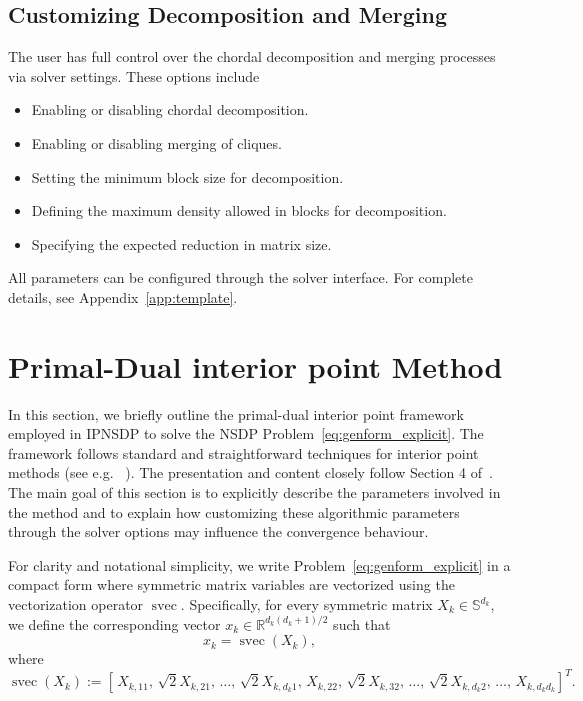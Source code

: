 \documentclass[]{interact}
\theoremstyle{plain}%
\theoremstyle{definition}
\theoremstyle{remark}
\begin{document}
\subsection{Customizing Decomposition and Merging}
\label{sec:chord_options}

The user has full control over the chordal decomposition and merging processes via solver settings. These options include

\begin{itemize}
  \item Enabling or disabling chordal decomposition.
  \item Enabling or disabling merging of cliques.
  \item Setting the minimum block size for decomposition.
  \item Defining the maximum density allowed in blocks for decomposition.
  \item Specifying the expected reduction in matrix size.
\end{itemize}

All parameters can be configured through the solver interface. For complete details, see Appendix~\ref{app:template}.





\section{Primal-Dual interior point Method}\label{sec:IPM}
In this section, we briefly outline the primal-dual interior point framework employed in IPNSDP to solve the NSDP  Problem~\eqref{eq:genform_explicit}. The framework follows standard and straightforward techniques for interior point methods (see e.g. ~\cite{Wright1997, IPMSDP_2012, Weldeyesus2015}). The presentation and content closely follow Section 4 of~\cite{Weldeyesus2022}. The main goal of this section is to explicitly describe the parameters involved in the method and to explain how customizing these algorithmic parameters through the solver options may influence the convergence behaviour.

For clarity and notational simplicity, we write Problem~\eqref{eq:genform_explicit} in a compact form where symmetric matrix variables are vectorized using the vectorization operator \( \operatorname{svec} \). Specifically, for every symmetric matrix \( X_k \in \mathbb{S}^{d_k} \), we define the corresponding vector \(x_k  \in \mathbb{R}^{d_k(d_k+1)/2}\) such that
\[x_k = \operatorname{svec}(X_k),\]
 where 
\[
\operatorname{svec}(X_k) := [\, X_{k,11},\, \sqrt{2}X_{k,21},\, \dots,\, \sqrt{2}X_{k,d_k1},\, X_{k,22},\, \sqrt{2}X_{k,32},\, \dots,\, \sqrt{2}X_{k,d_k2},\, \dots,\, X_{k,d_kd_k} ]^T.
\]
\end{document}

